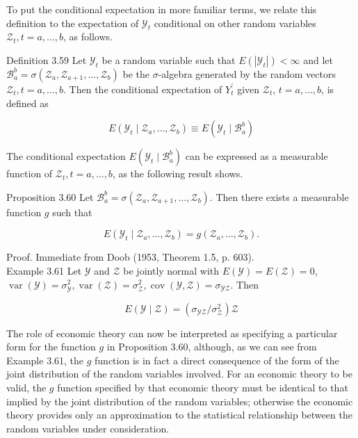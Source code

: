 \documentclass[10pt]{article}
\begin{document}
To put the conditional expectation in more familiar terms, we relate this definition to the expectation of $\mathcal{Y}_{t}$ conditional on other random variables $\mathcal{Z}_{t}, t=a, \ldots, b$, as follows.

Definition 3.59 Let $\mathcal{Y}_{t}$ be a random variable such that $E\left(\left|\mathcal{Y}_{t}\right|\right)<\infty$ and let $\mathcal{B}_{a}^{b}=\sigma\left(\mathcal{Z}_{a}, \mathcal{Z}_{a+1}, \ldots, \mathcal{Z}_{b}\right)$ be the $\sigma$-algebra generated by the random vectors $\mathcal{Z}_{t}, t=a, \ldots, b$. Then the conditional expectation of $Y_{t}^{\prime}$ given $\mathcal{Z}_{t}$, $t=a, \ldots, b$, is defined as

$$
E\left(\mathcal{Y}_{t} \mid \mathcal{Z}_{a}, \ldots, \mathcal{Z}_{b}\right) \equiv E\left(\mathcal{Y}_{t} \mid \mathcal{B}_{a}^{b}\right)
$$

The conditional expectation $E\left(\mathcal{Y}_{t} \mid \mathcal{B}_{a}^{b}\right)$ can be expressed as a measurable function of $\mathcal{Z}_{t}, t=a, \ldots, b$, as the following result shows.

Proposition 3.60 Let $\mathcal{B}_{a}^{b}=\sigma\left(\mathcal{Z}_{a}, \mathcal{Z}_{a+1}, \ldots, \mathcal{Z}_{b}\right)$. Then there exists a measurable function $g$ such that

$$
E\left(\mathcal{Y}_{t} \mid \mathcal{Z}_{a}, \ldots, \mathcal{Z}_{b}\right)=g\left(\mathcal{Z}_{a}, \ldots, \mathcal{Z}_{b}\right) .
$$

Proof. Immediate from Doob (1953, Theorem 1.5, p. 603).\\
Example 3.61 Let $\mathcal{Y}$ and $\mathcal{Z}$ be jointly normal with $E(\mathcal{Y})=E(\mathcal{Z})=0$, $\operatorname{var}(\mathcal{Y})=\sigma_{\mathcal{Y}}^{2}, \operatorname{var}(\mathcal{Z})=\sigma_{\mathcal{Z}}^{2}, \operatorname{cov}(\mathcal{Y}, \mathcal{Z})=\sigma_{\mathcal{Y} \mathcal{Z}}$. Then

$$
E(\mathcal{Y} \mid \mathcal{Z})=\left(\sigma_{\mathcal{Y} \mathcal{Z}} / \sigma_{\mathcal{Z}}^{2}\right) \mathcal{Z}
$$

The role of economic theory can now be interpreted as specifying a particular form for the function $g$ in Proposition 3.60, although, as we can see from Example 3.61, the $g$ function is in fact a direct consequence of the form of the joint distribution of the random variables involved. For an economic theory to be valid, the $g$ function specified by that economic theory must be identical to that implied by the joint distribution of the random variables; otherwise the economic theory provides only an approximation to the statistical relationship between the random variables under consideration.
\end{document}
